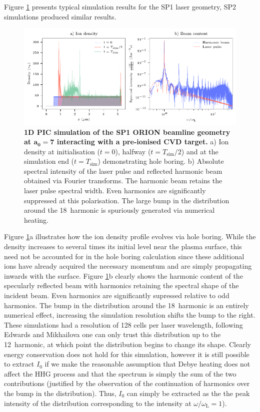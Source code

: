 Figure \ref{fig:orionsimfigs} presents typical simulation results for the SP1 laser geometry, SP2 simulations produced similar results.
\begin{figure}
	\centering
	\includegraphics{figures/orion/orion_sim_figs}
	\caption[Typical 1D HHG Smilei simulation results]{\textbf{1D PIC simulation of the SP1 ORION beamline geometry at $\mathbf{a_0 = 7}$ interacting with a pre-ionised CVD target.} a) Ion density at initialisation ($t=0$), halfway ($t=T_\mathrm{sim}/2$) and at the simulation end ($t=T_\mathrm{sim}$) demonstrating hole boring. b) Absolute spectral intensity of the laser pulse and reflected harmonic beam obtained via Fourier transforms. The harmonic beam retains the laser pulse spectral width. Even harmonics are significantly suppressed at this polarisation. The large bump in the distribution around the 18\th\ harmonic is spuriously generated via numerical heating.}
	\label{fig:orionsimfigs}
\end{figure}
Figure \ref{fig:orionsimfigs}a illustrates how the ion density profile evolves via hole boring. While the density increases to several times its initial level near the plasma surface, this need not be accounted for in the hole boring calculation since these additional ions have already acquired the necessary momentum and are simply propagating inwards with the surface. Figure \ref{fig:orionsimfigs}b clearly shows the harmonic content of the specularly reflected beam with harmonics retaining the spectral shape of the incident beam. Even harmonics are significantly supressed relative to odd harmonics. The bump in the distribution around the 18\th\ harmonic is an entirely numerical effect, increasing the simulation resolution shifts the bump to the right. These simulations had a resolution of 128 cells per laser wavelength, following Edwards and Mikhailova one can only trust this distribution up to the 12\th\ harmonic, at which point the distribution begins to change its shape. Clearly energy conservation does not hold for this simulation, however it is still possible to extract $I_0$ if we make the reasonable assumption that Debye heating does not affect the HHG process and that the spectrum is simply the sum of the two contributions (justified by the observation of the continuation of harmonics over the bump in the distribution). Thus, $I_0$ can simply be extracted as the the peak intensity of the distribution corresponding to the intensity at $\omega/\omega_\mathrm{L} = 1$).

